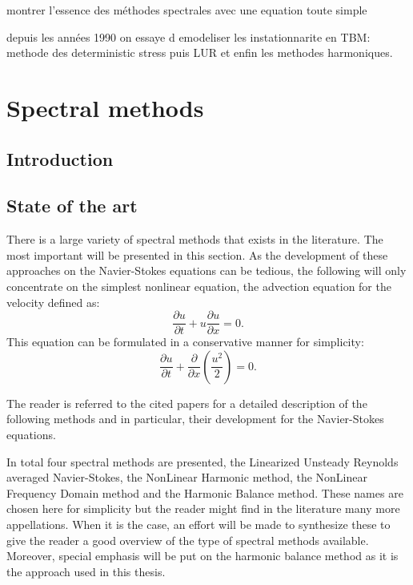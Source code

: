 
montrer l'essence des méthodes spectrales avec une equation toute simple

depuis les années 1990 on essaye d emodeliser les instationnarite en TBM:
methode des deterministic stress puis LUR et enfin les methodes harmoniques.

\chapter{Spectral methods} %
\label{cha:spectral_methods}

\section{Introduction} %
\label{sec:sm_introduction}

\section{State of the art} %
\label{sec:sm_state_of_the_art}

There is a large variety of spectral methods that exists in the
literature. The most important will be presented in this section.
As the development of these approaches on the Navier-Stokes equations
can be tedious, the following will only concentrate on the simplest
nonlinear equation, the advection equation for the velocity
defined as:
\begin{equation}
	\frac{\partial u}{\partial t} + 
	u \frac{\partial u}{\partial x} = 
	0.
	\label{eq:sm_nonlinear_convection}
\end{equation}
This equation can be formulated in a conservative manner for simplicity:
\begin{equation}
	\frac{\partial u}{\partial t} + 
	\frac{\partial}{\partial x} \left( \frac{u^2}{2} \right) = 
	0.
	\label{eq:sm_nonlinear_convection_conservative}
\end{equation}

The reader is referred to the cited papers for a detailed description
of the following methods and in particular, their
development for the Navier-Stokes equations. 

In total four spectral methods are presented, 
the Linearized Unsteady Reynolds averaged
Navier-Stokes, the NonLinear Harmonic method, the NonLinear Frequency Domain
method and the Harmonic Balance method.  
These names are chosen here
for simplicity but the reader might find in the literature many more
appellations. When it is the case, an effort will be made to synthesize
these to give the reader a good overview of the type of spectral methods available. Moreover, special emphasis will be put on the harmonic
balance method as it is the approach used in this thesis.

